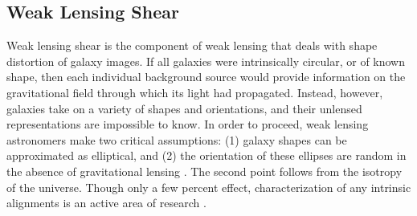 
\subsection{Weak Lensing Shear}
\label{sec:Shear}

Weak lensing shear is the component of weak lensing that deals with shape distortion of galaxy images. If all galaxies were intrinsically circular, or of known shape, then each individual background source would provide information on the gravitational field through which its light had propagated. Instead, however, galaxies take on a variety of shapes and orientations, and their unlensed representations are impossible to know. In order to proceed, weak lensing astronomers make two critical assumptions: (1) galaxy shapes can be approximated as elliptical, and (2) the orientation of these ellipses are random in the absence of gravitational lensing \citep{BS01}. The second point follows from the isotropy of the universe. Though only a few percent effect, characterization of any intrinsic alignments is an active area of research \citep[see e.g.][]{Hirata04,Heymans13}.

